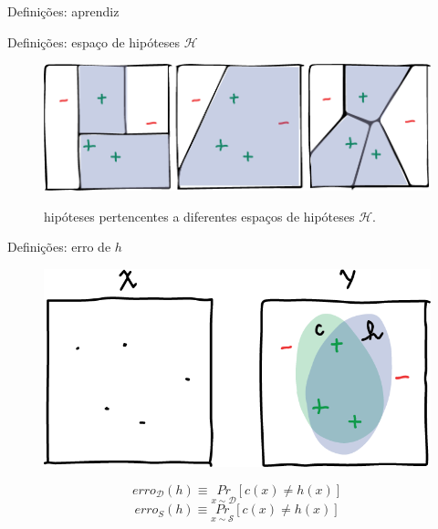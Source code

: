 \documentclass[10pt, professionalfonts]{beamer}
\begin{document}
{\begin{frame}{Definições: aprendiz}
\end{frame}
\begin{frame}{Definições: espaço de hipóteses  $\mathcal{H}$}
  \begin{figure}[!htp]
    \centering
    \includegraphics[width=.95\textwidth]{hspaces}
    \label{hspaces}
    \caption{hipóteses pertencentes a diferentes espaços de hipóteses $\mathcal{H}$.}
\end{figure}

\end{frame}

\begin{frame}{Definições: erro de $h$}
  \begin{figure}[!htp]
    \centering
    \includegraphics[width=.8\textwidth]{conceptVShypothesis}
    \label{conceptVShypothesis}
\end{figure}
\begin{equation}
  erro_{\mathcal{D}}(h) \equiv \underset{x \sim \mathcal{D}}{Pr}[c(x) \neq h(x)]
\end{equation}
\begin{equation}
erro_{S}(h) \equiv \underset{x \sim \mathcal{S}}{Pr}[c(x) \neq h(x)]
\end{equation}
\end{frame}

}
\end{document}
